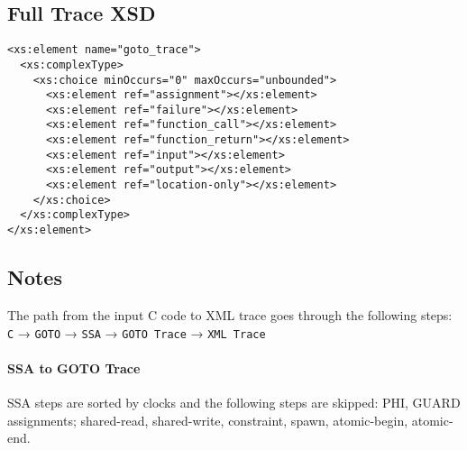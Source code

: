 \documentclass[12pt]{article}
\begin{document}
\subsection{Full Trace XSD}

\begin{verbatim}
<xs:element name="goto_trace">
  <xs:complexType>
    <xs:choice minOccurs="0" maxOccurs="unbounded">
      <xs:element ref="assignment"></xs:element>
      <xs:element ref="failure"></xs:element>
      <xs:element ref="function_call"></xs:element>
      <xs:element ref="function_return"></xs:element>
      <xs:element ref="input"></xs:element>
      <xs:element ref="output"></xs:element>
      <xs:element ref="location-only"></xs:element>
    </xs:choice>
  </xs:complexType>
</xs:element>
\end{verbatim}

\subsection{Notes}

The path from the input C code to XML trace goes through the following steps:\\

\texttt{C} → \texttt{GOTO} → \texttt{SSA} → \texttt{GOTO Trace} → \texttt{XML Trace}

\paragraph{SSA to GOTO Trace}

SSA steps are sorted by clocks and the following steps are skipped: PHI, GUARD
assignments; shared-read, shared-write, constraint, spawn, atomic-begin,
atomic-end.
\end{document}

